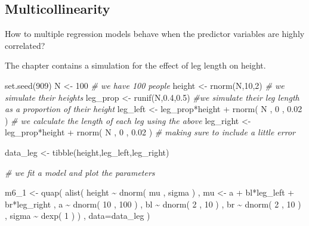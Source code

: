 \documentclass[
]{book}
\newenvironment{Shaded}{\begin{snugshade}}{\end{snugshade}}
\newcommand{\AttributeTok}[1]{\textcolor[rgb]{0.77,0.63,0.00}{#1}}
\newcommand{\CommentTok}[1]{\textcolor[rgb]{0.56,0.35,0.01}{\textit{#1}}}
\newcommand{\DecValTok}[1]{\textcolor[rgb]{0.00,0.00,0.81}{#1}}
\newcommand{\FloatTok}[1]{\textcolor[rgb]{0.00,0.00,0.81}{#1}}
\newcommand{\FunctionTok}[1]{\textcolor[rgb]{0.00,0.00,0.00}{#1}}
\newcommand{\NormalTok}[1]{#1}
\newcommand{\OtherTok}[1]{\textcolor[rgb]{0.56,0.35,0.01}{#1}}
\newcommand{\SpecialCharTok}[1]{\textcolor[rgb]{0.00,0.00,0.00}{#1}}
\begin{document}
\hypertarget{multicollinearity}{%
\subsection*{Multicollinearity}\label{multicollinearity}}

How to multiple regression models behave when the predictor variables are highly correlated?

The chapter contains a simulation for the effect of leg length on height.

\begin{Shaded}
\begin{Highlighting}[]
\FunctionTok{set.seed}\NormalTok{(}\DecValTok{909}\NormalTok{) }
\NormalTok{N }\OtherTok{\textless{}{-}} \DecValTok{100} \CommentTok{\# we have 100 people}
\NormalTok{height }\OtherTok{\textless{}{-}} \FunctionTok{rnorm}\NormalTok{(N,}\DecValTok{10}\NormalTok{,}\DecValTok{2}\NormalTok{) }\CommentTok{\# we simulate their heights}
\NormalTok{leg\_prop }\OtherTok{\textless{}{-}} \FunctionTok{runif}\NormalTok{(N,}\FloatTok{0.4}\NormalTok{,}\FloatTok{0.5}\NormalTok{) }\CommentTok{\#we simulate their leg length as a proportion of their height}
\NormalTok{leg\_left }\OtherTok{\textless{}{-}}\NormalTok{ leg\_prop}\SpecialCharTok{*}\NormalTok{height }\SpecialCharTok{+} \FunctionTok{rnorm}\NormalTok{( N , }\DecValTok{0}\NormalTok{ , }\FloatTok{0.02}\NormalTok{ ) }\CommentTok{\# we calculate the length of each leg using the above }
\NormalTok{leg\_right }\OtherTok{\textless{}{-}}\NormalTok{ leg\_prop}\SpecialCharTok{*}\NormalTok{height }\SpecialCharTok{+} \FunctionTok{rnorm}\NormalTok{( N , }\DecValTok{0}\NormalTok{ , }\FloatTok{0.02}\NormalTok{ ) }\CommentTok{\# making sure to include a little error}


\NormalTok{data\_leg }\OtherTok{\textless{}{-}} \FunctionTok{tibble}\NormalTok{(height,leg\_left,leg\_right)}

\CommentTok{\# we fit a model and plot the parameters}

\NormalTok{m6\_1 }\OtherTok{\textless{}{-}} \FunctionTok{quap}\NormalTok{( }
  \FunctionTok{alist}\NormalTok{(}
\NormalTok{    height }\SpecialCharTok{\textasciitilde{}} \FunctionTok{dnorm}\NormalTok{( mu , sigma ) , }
\NormalTok{    mu }\OtherTok{\textless{}{-}}\NormalTok{ a }\SpecialCharTok{+}\NormalTok{ bl}\SpecialCharTok{*}\NormalTok{leg\_left }\SpecialCharTok{+}\NormalTok{ br}\SpecialCharTok{*}\NormalTok{leg\_right , }
\NormalTok{    a }\SpecialCharTok{\textasciitilde{}} \FunctionTok{dnorm}\NormalTok{( }\DecValTok{10}\NormalTok{ , }\DecValTok{100}\NormalTok{ ) , }
\NormalTok{    bl }\SpecialCharTok{\textasciitilde{}} \FunctionTok{dnorm}\NormalTok{( }\DecValTok{2}\NormalTok{ , }\DecValTok{10}\NormalTok{ ) , }
\NormalTok{    br }\SpecialCharTok{\textasciitilde{}} \FunctionTok{dnorm}\NormalTok{( }\DecValTok{2}\NormalTok{ , }\DecValTok{10}\NormalTok{ ) , }
\NormalTok{    sigma }\SpecialCharTok{\textasciitilde{}} \FunctionTok{dexp}\NormalTok{( }\DecValTok{1}\NormalTok{ )}
\NormalTok{) , }\AttributeTok{data=}\NormalTok{data\_leg )}


\end{Highlighting}
\end{Shaded}
\end{document}
